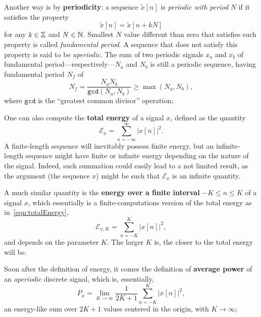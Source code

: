 \documentclass[\documentfontsize, twocolumn]{\classname}
\begin{document}
Another way is by \textbf{periodicity}: a se\-quen\-ce $\tilde{x}[n]$ is \emph{periodic with period} $N$ if it satisfies the property \[\tilde{x}[n] = \tilde{x}[n + kN]\] for any $k \in \mathbb Z$ and $N \in \mathbb N$. Smallest $N$ value different than zero that satisfies such property is called \emph{fundamental period}. A se\-quen\-ce that does not satisfy this property is said to be \emph{aperiodic}. The sum of two periodic signals $x_a$ and $x_b$ of fundamental period---re\-spec\-ti\-ve\-ly---$N_a$ and $N_b$ is still a periodic se\-quen\-ce, having fundamental period $N_f$ of 
\begin{equation}\label{eqn:greatestCommonDivisorPeriodFormula}
	N_f = \frac{N_a N_b}{\mathrm{\texttt{gcd}}(N_a, N_b)} \geq \max{(N_a, N_b)},
\end{equation} 
where $\mathrm{\texttt{gcd}}$ is the ``greatest common divisor'' operation;

One can also compute the \textbf{total energy} of a signal $x$, defined as the quantity
\begin{equation}\label{eqn:totalEnergy}
    \mathcal E_x = \sum_{n=-\infty}^{\infty} | x[n] |^2.
\end{equation}
A finite-length se\-quen\-ce will inevitably possess finite energy, but an infinite-length se\-quen\-ce might have finite or infinite energy depending on the nature of the signal. Indeed, such summation could easily lead to a not limited result, as the argument (the sequence $x$) might be such that $\mathcal E_x$ is an infinite quantity.

A much similar quantity is the \textbf{energy over a finite interval} $-K \leq n \leq K$ of a signal $x$, which essentially is a finite-computations version of the total energy as in~\ref{eqn:totalEnergy},
\begin{equation}\label{eqn:totalEnergyOverInterval}
    \mathcal E_{x,K} = \sum_{n=-K}^{K} | x[n] |^2,
\end{equation}
and depends on the parameter $K$. The larger $K$ is, the closer to the total energy will be.

Soon after the definition of energy, it comes the definition of \textbf{average power} of an \emph{aperiodic} discrete signal, which is, essentially,
\begin{equation}\label{eqn:averagePower}
    P_x = \lim_{K \rightarrow \infty} \frac{1}{2K + 1} \sum_{n = -K}^K |x[n]|^2,
\end{equation}
an energy-like sum over $2K + 1$ values centered in the origin, with $K \rightarrow \infty$;
\end{document}
